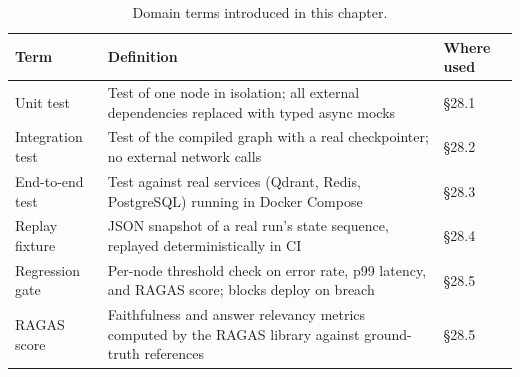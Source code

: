 \begin{table}[htbp]
\centering
\caption{Domain terms introduced in this chapter.}
\label{tab:ch28-terms}
\begin{tabularx}{\linewidth}{@{} l P{5cm} P{5.5cm} @{}}
\toprule
\textbf{Term} & \textbf{Definition} & \textbf{Where used} \\
\midrule
Unit test       & Test of one node in isolation; all external dependencies replaced with typed async mocks & \S28.1 \\
Integration test & Test of the compiled graph with a real checkpointer; no external network calls & \S28.2 \\
End-to-end test  & Test against real services (Qdrant, Redis, PostgreSQL) running in Docker Compose & \S28.3 \\
Replay fixture   & JSON snapshot of a real run's state sequence, replayed deterministically in CI & \S28.4 \\
Regression gate  & Per-node threshold check on error rate, p99 latency, and RAGAS score; blocks deploy on breach & \S28.5 \\
RAGAS score      & Faithfulness and answer relevancy metrics computed by the RAGAS library against ground-truth references & \S28.5 \\
\bottomrule
\end{tabularx}
\end{table}

\begin{sourcelayout}
\end{sourcelayout}

